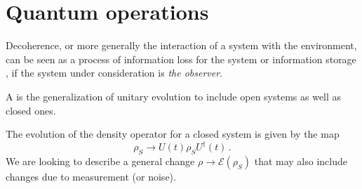 \section{Quantum operations}

Decoherence,
or more generally the interaction of a system with the environment,
can be seen as a process of information loss for the system
\parencite[Ch. 9]{Nakahara} or information storage
\parencite{Zurek_Einselect}, if the system under consideration
is \emph{the observer}.

A  \parencite[Ch. 9]{Nakahara} is the generalization
of unitary evolution to include open systems as well as closed ones.

The evolution of the density operator for a closed system is given by the map
\[
    \rho_{S} \rightarrow U(t)\rho_{S}U^{\dagger}(t) \, \text{.}
\] 
We are looking to describe a general change
$\rho \rightarrow \mathcal{E}(\rho_{S})$ that may also include
changes due to measurement (or noise).
